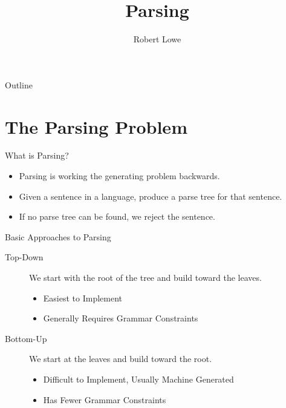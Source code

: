 \documentclass[handout]{beamer}
\title{Parsing}
\author{Robert Lowe}
\institute[Southeast Missouri State University] %
{
  Department of Computer Science\\
  Southeast Missouri State University
}
\date[]{}
\begin{document}
\begin{frame}
  \titlepage
\end{frame}

\begin{frame}{Outline}
  \tableofcontents
\end{frame}




\section{The Parsing Problem}
\begin{frame}{What is Parsing?}
    \begin{itemize}
        \item Parsing is working the generating problem backwards.
        \item Given a sentence in a language, produce a parse tree for that sentence.
        \item If no parse tree can be found, we reject the sentence.
    \end{itemize}
\end{frame}

\begin{frame}{Basic Approaches to Parsing}
    \begin{description}
        \item[Top-Down] We start with the root of the tree and build toward the leaves.
        \begin{itemize}
            \item Easiest to Implement
            \item Generally Requires Grammar Constraints
        \end{itemize}
        \item[Bottom-Up] We start at the leaves and build toward the root.
        \begin{itemize}
            \item Difficult to Implement, Usually Machine Generated
            \item Has Fewer Grammar Constraints
        \end{itemize}
    \end{description}
\end{frame}
\end{document}
